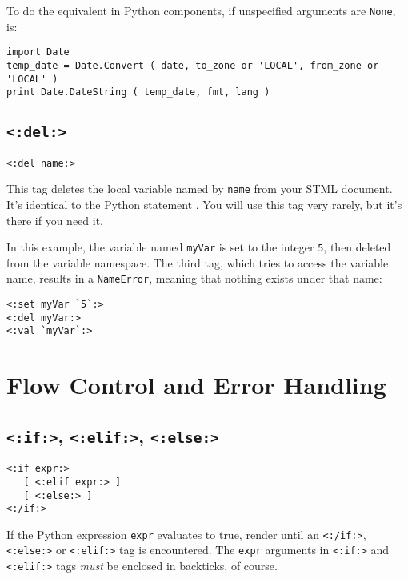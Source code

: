 \documentclass{manual}
\begin{document}
To do the equivalent in Python components, if unspecified arguments are \texttt{None}, is:
\begin{verbatim}
import Date
temp_date = Date.Convert ( date, to_zone or 'LOCAL', from_zone or 'LOCAL' )
print Date.DateString ( temp_date, fmt, lang )
\end{verbatim}






\section{\texttt{<:del:>}}
\label{tagdel}

\begin{verbatim}
<:del name:>
\end{verbatim}

This tag deletes the local variable named by \texttt{name}
from your STML document. It's identical to the Python statement
. You will use this tag very rarely,
but it's there if you need it.

In this example, the variable named \texttt{myVar} is set to
the integer \texttt{5}, then deleted from the variable namespace.
The third tag, which tries to access the variable name, results in
a \texttt{NameError}, meaning that nothing exists under that name:

\begin{verbatim}
<:set myVar `5`:>
<:del myVar:>
<:val `myVar`:>
\end{verbatim}



\chapter{Flow Control and Error Handling}
\label{stmlrefcontrol}


\section{\texttt{<:if:>}, \texttt{<:elif:>}, \texttt{<:else:>}}
\label{tagif}

\begin{verbatim}<:if expr:>
   [ <:elif expr:> ]
   [ <:else:> ]
<:/if:>
\end{verbatim}

If the Python expression \texttt{expr} evaluates to true, 
render until an \texttt{<:/if:>}, \texttt{<:else:>} 
or \texttt{<:elif:>} tag is encountered.  The
\texttt{expr} arguments in  
\texttt{<:if:>} and \texttt{<:elif:>} tags \emph{must} be 
enclosed in backticks, of course.
\end{document}
